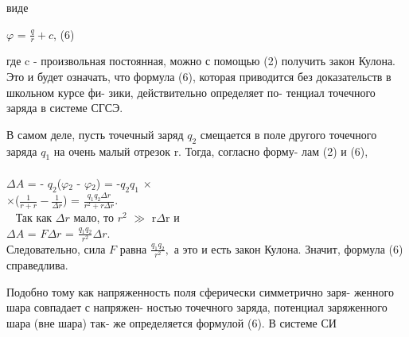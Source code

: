 \documentclass{memoir}
\begin{document}
\begin{multicols}{2}
\begin{small}
\begin{justify}

\parindent0pt
виде\linebreak
\parindent60pt

$\varphi$ = $\frac{q}{r} + c$, \indent (6)\linebreak

\parindent0pt

где c - произвольная постоянная,\linebreak
можно с помощью (2) получить закон\linebreak
Кулона. Это и будет означать, что\linebreak
формула (6), которая приводится без\linebreak
доказательств в школьном курсе фи-\linebreak
зики, действительно определяет по-\linebreak
тенциал точечного заряда в системе\linebreak
СГСЭ.\linebreak


\parindent20pt
В самом деле, пусть точечный\linebreak
заряд $q_2$ смещается в поле другого\linebreak
точечного заряда $q_1$ на очень малый\linebreak
отрезок r. Тогда, согласно форму-\linebreak
лам (2) и (6), \\\\
$\Delta A$ = - $q_2$($\varphi$$_2$ - $\varphi$$_2$) = -$q_2$$q_1$ $\times$ \\
\parindent60pt
\indent $\times$($\frac{1}{r + r} - \frac{1}{\Delta r}$) = $\frac{q_1 q_2 \Delta r}{r^2 + r \Delta r}$. \\\
\parindent20pt
\indent Так как $\Delta r$ мало, то $r^2$ $\gg$ r$\Delta$r и \\
\parindent45pt
\indent $\Delta A$ = $F \Delta r$ = $\frac{q_1 q_2}{r^2} \Delta r .$ \\

\parindent0pt
Следовательно, сила $F$ равна $\frac{q_1 q_2}{r^2},$\linebreak
а это и есть закон Кулона. Значит,\linebreak
формула (6) справедлива. \\
\parindent20pt

\indent Подобно тому как напряженность\linebreak
поля сферически симметрично заря-\linebreak
женного шара совпадает с напряжен-\linebreak
ностью точечного заряда, потенциал\linebreak
заряженного шара (вне шара) так-\linebreak
же определяется формулой (6). В\linebreak
системе СИ\\


\end{justify}
\end{small}
\end{multicols}
\end{document}
